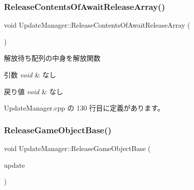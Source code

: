 \mbox{\label{class_update_manager_ac87db8037fbfb800187c50ca22a1f01d}} 
\subsubsection{\texorpdfstring{Release\+Contents\+Of\+Await\+Release\+Array()}{ReleaseContentsOfAwaitReleaseArray()}}
{\footnotesize\ttfamily void Update\+Manager\+::\+Release\+Contents\+Of\+Await\+Release\+Array (\begin{DoxyParamCaption}{ }\end{DoxyParamCaption})\hspace{0.3cm}{\ttfamily [private]}}



解放待ち配列の中身を解放関数 


\begin{DoxyParams}{引数}
{\em void} & なし \\
\hline
\end{DoxyParams}

\begin{DoxyRetVals}{戻り値}
{\em void} & なし \\
\hline
\end{DoxyRetVals}


 Update\+Manager.\+cpp の 130 行目に定義があります。

\mbox{\label{class_update_manager_ae74872df6b8761ac78744be1211da791}} 
\subsubsection{\texorpdfstring{Release\+Game\+Object\+Base()}{ReleaseGameObjectBase()}}
{\footnotesize\ttfamily void Update\+Manager\+::\+Release\+Game\+Object\+Base (\begin{DoxyParamCaption}\item[{\mbox{\hyperlink{class_game_object_base}{Game\+Object\+Base}} $\ast$}]{update }\end{DoxyParamCaption})}



